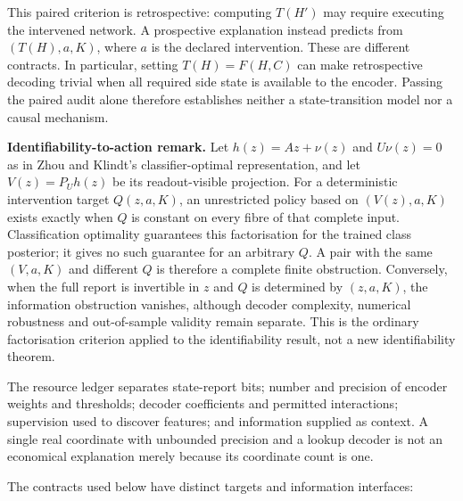 \documentclass[
  british,
  11pt,
  a4paper,
]{article}
\begin{document}
This paired criterion is retrospective: computing \(T(H')\) may require
executing the intervened network. A prospective explanation instead
predicts from \((T(H),a,K)\), where \(a\) is the declared intervention.
These are different contracts. In particular, setting \(T(H)=F(H,C)\)
can make retrospective decoding trivial when all required side state is
available to the encoder. Passing the paired audit alone therefore
establishes neither a state-transition model nor a causal mechanism.

\textbf{Identifiability-to-action remark.} Let \(h(z)=Az+\nu(z)\) and
\(U\nu(z)=0\) as in Zhou and Klindt's classifier-optimal representation,
and let \(V(z)=P_Uh(z)\) be its readout-visible projection. For a
deterministic intervention target \(Q(z,a,K)\), an unrestricted policy
based on \((V(z),a,K)\) exists exactly when \(Q\) is constant on every
fibre of that complete input. Classification optimality guarantees this
factorisation for the trained class posterior; it gives no such
guarantee for an arbitrary \(Q\). A pair with the same \((V,a,K)\) and
different \(Q\) is therefore a complete finite obstruction. Conversely,
when the full report is invertible in \(z\) and \(Q\) is determined by
\((z,a,K)\), the information obstruction vanishes, although decoder
complexity, numerical robustness and out-of-sample validity remain
separate. This is the ordinary factorisation criterion applied to the
identifiability result, not a new identifiability theorem.

The resource ledger separates state-report bits; number and precision of
encoder weights and thresholds; decoder coefficients and permitted
interactions; supervision used to discover features; and information
supplied as context. A single real coordinate with unbounded precision
and a lookup decoder is not an economical explanation merely because its
coordinate count is one.

The contracts used below have distinct targets and information
interfaces:
\end{document}
